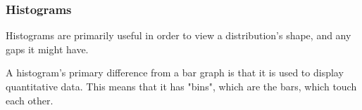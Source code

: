 \subsubsection{Histograms}
Histograms are primarily useful in order to view a distribution's shape, and any
gaps it might have.

A histogram's primary difference from a bar graph is that it is used to display 
quantitative data. This means that it has "bins", which are the bars, which touch each other.

